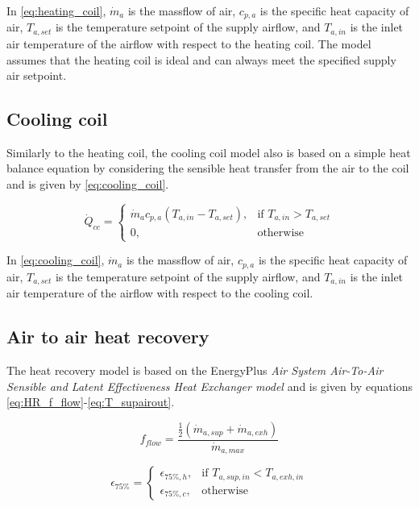 In \autoref{eq:heating_coil}, $\dot{m}_a$ is the massflow of air, $c_{p,a}$ is the specific heat capacity of air, $T_{a,set}$ is the temperature setpoint of the supply airflow, and $T_{a,in}$ is the inlet air temperature of the airflow with respect to the heating coil. The model assumes that the heating coil is ideal and can always meet the specified supply air setpoint. 

\subsection{Cooling coil}
Similarly to the heating coil, the cooling coil model also is based on a simple heat balance equation by considering the sensible heat transfer from the air to the coil and is given by \autoref{eq:cooling_coil}. 

\begin{equation}
    \dot{Q}_{cc} = \begin{cases}
        \dot{m}_a c_{p,a} (T_{a,in}-T_{a,set}),& \text{if } T_{a,in}>T_{a,set}\\
        0,              & \text{otherwise}
    \end{cases}
    \label{eq:cooling_coil}
\end{equation}

In \autoref{eq:cooling_coil}, $\dot{m}_a$ is the massflow of air, $c_{p,a}$ is the specific heat capacity of air, $T_{a,set}$ is the temperature setpoint of the supply airflow, and $T_{a,in}$ is the inlet air temperature of the airflow with respect to the cooling coil. 




\subsection{Air to air heat recovery}

The heat recovery model is based on the EnergyPlus \textit{Air System Air-To-Air Sensible and Latent Effectiveness Heat Exchanger model} \cite{energy2021a} and is given by equations \ref{eq:HR_f_flow}-\ref{eq:T_supairout}. 

\begin{equation}
    f_{flow} = \frac{\frac{1}{2} \left( \dot{m}_{a,sup} + \dot{m}_{a,exh} \right)}{\dot{m}_{a,max}}
    \label{eq:HR_f_flow}
\end{equation}

\begin{equation}
    \epsilon_{75\%} = \begin{cases}
        \epsilon_{75\%,h},& \text{if } T_{a,sup,in}<T_{a,exh,in}\\
        \epsilon_{75\%,c},              & \text{otherwise}
    \end{cases}
    \label{eq:eps_75}
\end{equation}

